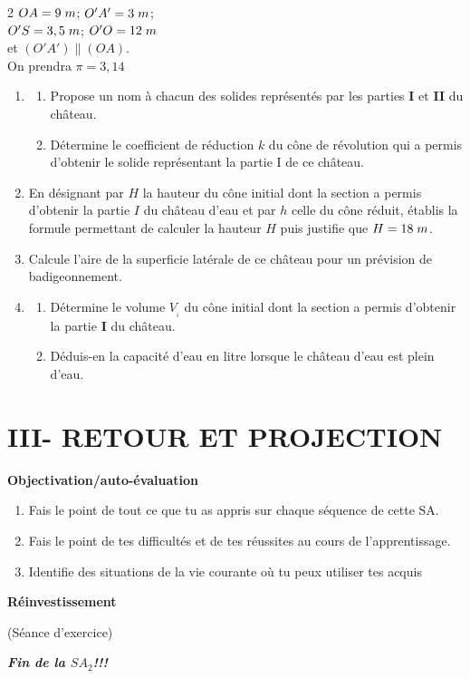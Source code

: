 \begin{multicols*}{2}
  	$OA=9\hspace{0.1cm}m$; $O'A'=3\hspace{0.1cm}m$;\\ $O'S=3,5\hspace{0.1cm}m$; $O'O= 12\hspace{0.1cm}m$\\ et $(O'A')\lVert(OA)$.\\
  	On prendra  $\pi=3,14$
  	\begin{enumerate}
  		\item 
  		\begin{enumerate}
  			\item  Propose un nom à chacun des solides représentés par les parties \textbf{I} et \textbf{II} du château.
  			\item   Détermine le coefficient de réduction $k$ du cône de révolution qui a permis d’obtenir le solide 
  			représentant la partie I de ce château. 
  		\end{enumerate}	
  		\item En désignant par $H$ la hauteur du cône initial dont la section a permis d’obtenir la partie $I$ du château d’eau et par $h$ celle du cône réduit, établis la formule permettant de calculer la hauteur $H$ puis justifie que $H=18\hspace{0.1cm}m$.
  		\item Calcule l’aire de la superficie latérale de ce château pour un prévision de badigeonnement.
  		\item 
  		\begin{enumerate}
  			\item  Détermine le volume $V_{_{i}}$ du cône initial dont la section a permis d’obtenir la partie \textbf{I} du château.
  			\item  Déduis-en la capacité d’eau en litre lorsque le château d’eau est plein
  			d’eau.
  		\end{enumerate}	
  	\end{enumerate}	
  	\doc
  	\section*{III- RETOUR ET PROJECTION}
  	 \textbf{Objectivation/auto-évaluation}
  	
  	\begin{enumerate}
  		\item  Fais le point de tout ce que tu as appris sur chaque séquence de cette SA. 
  		\item  Fais le point de tes difficultés et de tes réussites au cours de l'apprentissage.
  		\item  Identifie des situations de la vie courante où tu peux utiliser tes acquis
  	\end{enumerate}
  	 \textbf{Réinvestissement}
  	
  	(Séance d'exercice)
  	\begin{center}
  		\it\textit{\textbf{Fin de la $SA_{2} $!!!}}
  	\end{center}
  \end{multicols*}
